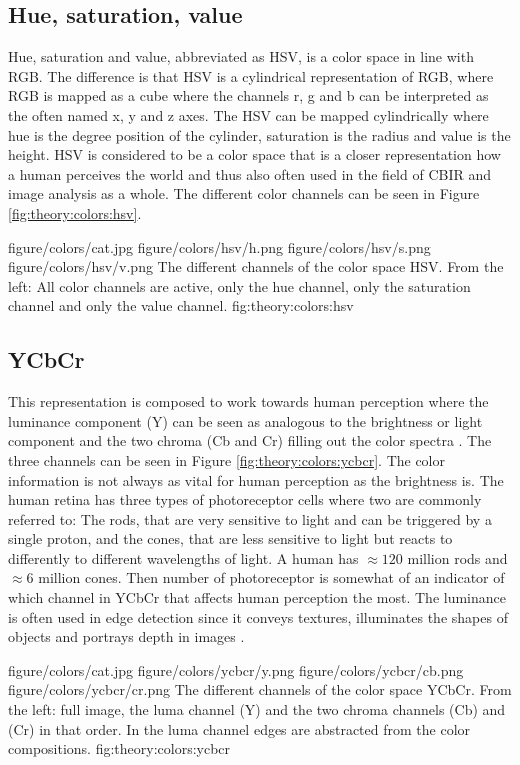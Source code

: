 \subsection{Hue, saturation, value}
\label{sec:HSV_theory}
Hue, saturation and value, abbreviated as HSV, is a color space in line with RGB. The difference is that HSV is a cylindrical representation of RGB, where RGB is mapped as a cube where the channels r, g and b can be interpreted as the often named x, y and z axes. The HSV can be mapped cylindrically where hue is the degree position of the cylinder, saturation is the radius and value is the height. HSV is considered to be a color space that is a closer representation how a human perceives the world and thus also often used in the field of CBIR and image analysis as a whole. The different color channels can be seen in Figure \ref{fig:theory:colors:hsv}.


\fourfigure
{figure/colors/cat.jpg}
{figure/colors/hsv/h.png}
{figure/colors/hsv/s.png}
{figure/colors/hsv/v.png}
{The different channels of the color space HSV. From the left: All color channels are active, only the hue channel, only the saturation channel and only the value channel.}
{fig:theory:colors:hsv} 

\subsection{YCbCr}
\label{sec:ycbcr}
This representation is composed to work towards human perception where the luminance component (Y) can be seen as analogous to the brightness or light component and the two chroma (Cb and Cr) filling out the color spectra \cite{midha2014analysis}. The three channels can be seen in Figure \ref{fig:theory:colors:ycbcr}.
The color information is not always as vital for human perception as the brightness is. The human retina has three types of photoreceptor cells where two are commonly referred to: The rods, that are very sensitive to light and can be triggered by a single proton, and the cones, that are less sensitive to light but reacts to differently to different wavelengths of light. A human has $\approx120$ million rods and $\approx6$ million cones. Then number of photoreceptor is somewhat of an indicator of which channel in YCbCr that affects human perception the most. 
The luminance is often used in edge detection since it conveys textures, illuminates the shapes of objects and portrays depth in images \cite{su2011coldimage}\cite{prajapatiedge}. 

\fourfigure
{figure/colors/cat.jpg}
{figure/colors/ycbcr/y.png}
{figure/colors/ycbcr/cb.png}
{figure/colors/ycbcr/cr.png}
{The different channels of the color space YCbCr. From the left: full image, the luma channel (Y) and the two chroma channels (Cb) and (Cr) in that order. In the luma channel edges are abstracted from the color compositions.}
{fig:theory:colors:ycbcr} 


